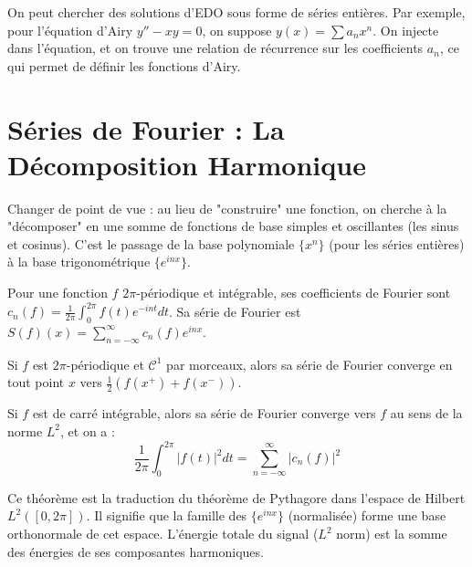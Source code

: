 \begin{application}
    On peut chercher des solutions d'EDO sous forme de séries entières. Par exemple, pour l'équation d'Airy $y'' - xy = 0$, on suppose $y(x) = \sum a_n x^n$. On injecte dans l'équation, et on trouve une relation de récurrence sur les coefficients $a_n$, ce qui permet de définir les fonctions d'Airy.
\end{application}

\section{Séries de Fourier : La Décomposition Harmonique}

\begin{objectif}
    Changer de point de vue : au lieu de "construire" une fonction, on cherche à la "décomposer" en une somme de fonctions de base simples et oscillantes (les sinus et cosinus). C'est le passage de la base polynomiale $\{x^n\}$ (pour les séries entières) à la base trigonométrique $\{e^{inx}\}$.
\end{objectif}

\begin{definition}
    Pour une fonction $f$ $2\pi$-périodique et intégrable, ses coefficients de Fourier sont $c_n(f) = \frac{1}{2\pi}\int_0^{2\pi} f(t)e^{-int}dt$. Sa série de Fourier est $S(f)(x) = \sum_{n=-\infty}^\infty c_n(f) e^{inx}$.
\end{definition}

\begin{theorem}
    Si $f$ est $2\pi$-périodique et $\mathcal{C}^1$ par morceaux, alors sa série de Fourier converge en tout point $x$ vers $\frac{1}{2}(f(x^+) + f(x^-))$.
\end{theorem}

\begin{theorem}
    Si $f$ est de carré intégrable, alors sa série de Fourier converge vers $f$ au sens de la norme $L^2$, et on a :
    $$ \frac{1}{2\pi} \int_0^{2\pi} |f(t)|^2 dt = \sum_{n=-\infty}^\infty |c_n(f)|^2 $$
\end{theorem}

\begin{remark}
    Ce théorème est la traduction du théorème de Pythagore dans l'espace de Hilbert $L^2([0,2\pi])$. Il signifie que la famille des $\{e^{inx}\}$ (normalisée) forme une base orthonormale de cet espace. L'énergie totale du signal ($L^2$ norm) est la somme des énergies de ses composantes harmoniques.
\end{remark}

